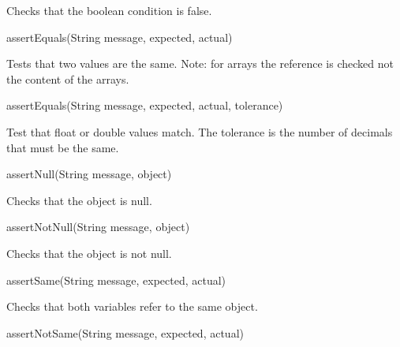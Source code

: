 \documentclass[
]{book}
\newenvironment{Shaded}{\begin{snugshade}}{\end{snugshade}}
\newcommand{\BuiltInTok}[1]{#1}
\newcommand{\FunctionTok}[1]{\textcolor[rgb]{0.00,0.00,0.00}{#1}}
\newcommand{\NormalTok}[1]{#1}
\begin{document}
Checks that the boolean condition is false.

\begin{Shaded}
\begin{Highlighting}[]
\FunctionTok{assertEquals}\NormalTok{(}\BuiltInTok{String}\NormalTok{ message, expected, actual)}
\end{Highlighting}
\end{Shaded}

Tests that two values are the same. Note: for arrays the reference is checked not the content of the arrays.

\begin{Shaded}
\begin{Highlighting}[]
\FunctionTok{assertEquals}\NormalTok{(}\BuiltInTok{String}\NormalTok{ message, expected, actual, tolerance)}
\end{Highlighting}
\end{Shaded}

Test that float or double values match. The tolerance is the number of decimals that must be the same.

\begin{Shaded}
\begin{Highlighting}[]
\FunctionTok{assertNull}\NormalTok{(}\BuiltInTok{String}\NormalTok{ message, object)}
\end{Highlighting}
\end{Shaded}

Checks that the object is null.

\begin{Shaded}
\begin{Highlighting}[]
\FunctionTok{assertNotNull}\NormalTok{(}\BuiltInTok{String}\NormalTok{ message, object)}
\end{Highlighting}
\end{Shaded}

Checks that the object is not null.

\begin{Shaded}
\begin{Highlighting}[]
\FunctionTok{assertSame}\NormalTok{(}\BuiltInTok{String}\NormalTok{ message, expected, actual)}
\end{Highlighting}
\end{Shaded}

Checks that both variables refer to the same object.

\begin{Shaded}
\begin{Highlighting}[]
\FunctionTok{assertNotSame}\NormalTok{(}\BuiltInTok{String}\NormalTok{ message, expected, actual)}
\end{Highlighting}
\end{Shaded}
\end{document}
